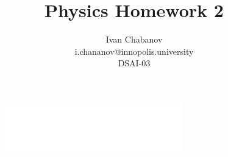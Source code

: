 \begin{titlepage}

    \title{Physics Homework 2}
    \author{Ivan Chabanov\\i.chananov@innopolis.university\\DSAI-03}

    \begin{figure}[t]
        \centering
        \includegraphics[width=0.69\textwidth]{innou-logo.png} %
    \end{figure}

    \maketitle

\end{titlepage}
